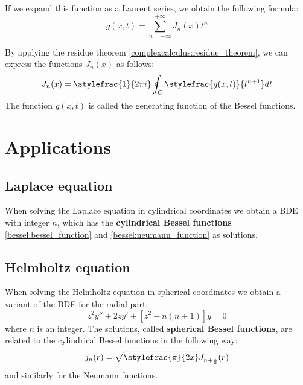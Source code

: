     \noindent If we expand this function as a Laurent series, we obtain the following formula:
    \begin{equation}
		\label{bessel:generating_function_expansion}
        g(x, t) = \sum_{n=-\infty}^{+\infty}J_n(x)t^n
	\end{equation}
    
    \noindent By applying the residue theorem \ref{complexcalculus:residue_theorem}, we can express the functions $J_n(x)$ as follows:
    \begin{equation}
		\label{bessel:generating_function_integral}
        J_n(x) = \stylefrac{1}{2\pi i}\oint_C\stylefrac{g(x, t)}{t^{n+1}}dt
	\end{equation}
    The function $g(x, t)$ is called the generating function of the Bessel functions.
    
\section{Applications}
\subsection{Laplace equation}
	When solving the Laplace equation in cylindrical coordinates we obtain a BDE with integer $n$, which has the \textbf{cylindrical Bessel functions} \ref{bessel:bessel_function} and \ref{bessel:neumann_function} as solutions.
    
\subsection{Helmholtz equation}
	When solving the Helmholtz equation in spherical coordinates we obtain a variant of the BDE for the radial part:
    \begin{equation}
		z^2y'' + 2zy' + [z^2 - n(n+1)]y = 0
	\end{equation}
    where $n$ is an integer. The solutions, called \textbf{spherical Bessel functions}, are related to the cylindrical Bessel functions in the following way:
    \begin{equation}
		j_n(r) = \sqrt{\stylefrac{\pi}{2x}}J_{n + \frac{1}{2}}(r)
	\end{equation}
    and similarly for the Neumann functions.
